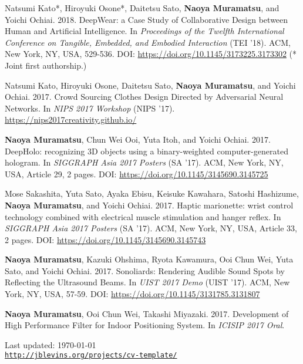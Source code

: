 \documentclass[letterpaper]{article}
\def\footerlink{http://jblevins.org/projects/cv-template/}
\renewenvironment{itemize}{
  \begin{list}{}{
    \setlength{\leftmargin}{1.5em}
  }
}{
  \end{list}
}
\begin{document}
\begin{itemize}
  \item Natsumi Kato*, Hiroyuki Osone*, Daitetsu Sato, {\bf Naoya Muramatsu}, and Yoichi Ochiai. 2018. DeepWear: a Case Study of Collaborative Design between Human and Artificial Intelligence. In {\it Proceedings of the Twelfth International Conference on Tangible, Embedded, and Embodied Interaction} (TEI ’18). ACM, New York, NY, USA, 529-536. DOI: \url{https://doi.org/10.1145/3173225.3173302} (* Joint first authorship.)

  \item Natsumi Kato, Hiroyuki Osone, Daitetsu Sato, {\bf Naoya Muramatsu}, and Yoichi Ochiai. 2017. Crowd Sourcing Clothes Design Directed by Adversarial Neural Networks. In {\it NIPS 2017 Workshop} (NIPS ’17). \url{https://nips2017creativity.github.io/}

  \item {\bf Naoya Muramatsu}, Chun Wei Ooi, Yuta Itoh, and Yoichi Ochiai. 2017. DeepHolo: recognizing 3D objects using a binary-weighted computer-generated hologram. In {\it SIGGRAPH Asia 2017 Posters} (SA ’17). ACM, New York, NY, USA, Article 29, 2 pages. DOI: \url{https://doi.org/10.1145/3145690.3145725}

  \item Mose Sakashita, Yuta Sato, Ayaka Ebisu, Keisuke Kawahara, Satoshi Hashizume, {\bf Naoya Muramatsu}, and Yoichi Ochiai. 2017. Haptic marionette: wrist control technology combined with electrical muscle stimulation and hanger reflex. In {\it SIGGRAPH Asia 2017 Posters} (SA ’17). ACM, New York, NY, USA, Article 33, 2 pages. DOI: \url{https://doi.org/10.1145/3145690.3145743}

  \item {\bf Naoya Muramatsu}, Kazuki Ohshima, Ryota Kawamura, Ooi Chun Wei, Yuta Sato, and Yoichi Ochiai. 2017. Sonoliards: Rendering Audible Sound Spots by Reflecting the Ultrasound Beams. In {\it UIST 2017 Demo} (UIST ’17). ACM, New York, NY, USA, 57-59. DOI: \url{https://doi.org/10.1145/3131785.3131807}

  \item {\bf Naoya Muramatsu}, Ooi Chun Wei, Takashi Miyazaki. 2017. Development of High Performance Filter for Indoor Positioning System. In {\it ICISIP 2017 Oral}.

\end{itemize}

\bigskip

\begin{center}
  \begin{footnotesize}
    Last updated: \today \\
    \href{\footerlink}{\texttt{\footerlink}}
  \end{footnotesize}
\end{center}
\end{document}
